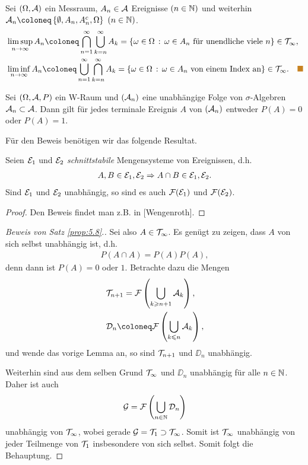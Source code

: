 \begin{bsp}
Sei $(\Omega, {\cal A })$ ein Messraum, $A_{n} \in \AA$ Ereignisse $(n \in
\N)$ und weiterhin\\
$\AA_{n}\defl \setd{\emptyset, A_{n}, A_{n}^ {c},\Omega}$ $(n\in
\N)$.
\begin{align*}
&\limsup\limits_{n\to \infty} A_{n} \defl \bigcap^{\infty}_{n=1}
\bigcup^ {\infty}_{k=n}  A_{k}= \setdef{\omega \in
\Omega}{\omega \in A_{n}\text{ für unendliche viele }n} \in {\TT}_{\infty},\\
&\liminf\limits_{n\to \infty} A_{n} \defl \bigcup\limits^{\infty}_{n=1}
\bigcap^ {\infty}_{k=n} A_{k} = \setdef{ \omega \in
\Omega}{\omega \in A_{n}\text{ von einem Index an}} \in {\TT}_{\infty}.\bsphere
\end{align*}
\end{bsp}

\begin{prop}
\label{prop:5.8}
Sei $(\Omega,\AA, P)$ ein W-Raum und $(\AA_{n})$ eine unabhängige Folge
von $\sigma$-Algebren $\AA_{n} \subset \AA$.
Dann gilt für jedes terminale Ereignis $A$ von $(\AA_{n})$ entweder
$P(A)=0$ oder $P(A) = 1$.\fishhere
\end{prop}

Für den Beweis benötigen wir das folgende Resultat.
\begin{lemn}
Seien $\EE_1$ und $\EE_2$ \emph{schnittstabile} Mengensysteme von Ereignissen,
d.h.
\begin{align*}
A,B\in \EE_{1},\EE_{2}\Rightarrow A\cap B\in \EE_{1},\EE_{2}.
\end{align*}
Sind $\EE_1$ und $\EE_2$ unabhängig, so sind es auch $\FF(\EE_1)$ und
$\FF(\EE_2)$.\fishhere
\end{lemn}
\begin{proof}
Den Beweis findet man z.B. in [Wengenroth].\qedhere
\end{proof}

\begin{proof}[Beweis von Satz \ref{prop:5.8}.]
Sei also $A\in\TT_\infty$. Es genügt zu zeigen, dass $A$ von sich selbst
unabhängig ist, d.h.
\begin{align*}
P(A\cap A) = P(A)P(A),
\end{align*}
denn dann ist $P(A)=0$ oder $1$. Betrachte dazu die Mengen
\begin{align*}
&\TT_{n+1}=\FF\left(\bigcup_{k\ge n+1} \AA_k\right),\\
&\DD_n\defl\FF\left(\bigcup_{k\le n} \AA_k\right),
\end{align*}
und wende das vorige Lemma an, so sind $\TT_{n+1}$ und $\DD_n$ unabhängig.

Weiterhin sind aus dem selben Grund $\TT_{\infty}$ und $\DD_n$ unabhängig für
alle $n\in\N$. Daher ist auch
\begin{align*}
\GG =\FF\left(\bigcup_{n\in\N} \DD_n\right)
\end{align*}
unabhängig von $\TT_{\infty}$, wobei gerade $\GG = \TT_1 \supset \TT_{\infty}$.
Somit ist $\TT_{\infty}$ unabhängig von jeder Teilmenge von $\TT_1$
insbesondere von sich selbst. Somit folgt die Behauptung.\qedhere
\end{proof}

